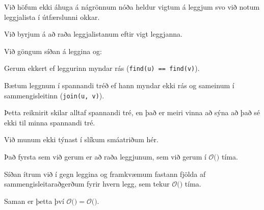 {
	{
		\item<1-> Við höfum ekki áhuga á nágrönnum nóða heldur vigtum á leggjum svo við notum leggjalista í útfærslunni okkar.
		\item<2-> Við byrjum á að raða leggjalistanum eftir vigt leggjanna.
		\item<3-> Við göngum síðan á leggina og:
		{
			\item<4-> Gerum ekkert ef leggurinn myndar rás (\texttt{find(u) == find(v)}).
			\item<5-> Bætum leggnum í spannandi tréð ef hann myndar ekki rás og sameinum í sammengisleitinn (\texttt{join(u, v)}).
		}
	}
}

{
	{
		\item<1-> Þetta reiknirit skilar alltaf spannandi tré, en það er meiri vinna að sýna að það sé ekki til minna spannandi tré.
		\item<2-> Við munum ekki týnast í slíkum smáatriðum hér.
	}
}

{
}

{
	{
		\item<1-> Það fyrsta sem við gerum er að raða leggjunum, sem við gerum í $\mathcal{O}($$)$ tíma.
		\item<3-> Síðan ítrum við í gegn leggina og framkvæmum fastann fjölda af sammengisleitaraðgerðum fyrir hvern legg, sem tekur
					$\mathcal{O}($\onslide<4->{$E \alpha(V)$}$)$ tíma.
		\item<5-> Saman er þetta því $\mathcal{O}($$) = \mathcal{O}($\onslide<7->{$E \log E$}$)$.
	}
}

{
}


